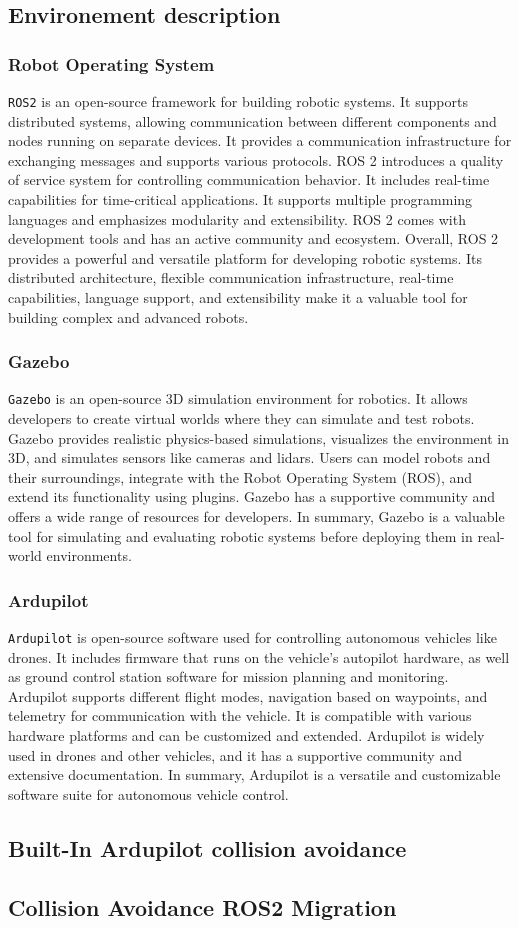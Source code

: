 \subsection{Environement description}
\subsubsection{Robot Operating System}
\texttt{ROS2} is an open-source framework for building robotic systems. It supports distributed systems, allowing communication between different components and nodes running on separate devices.
It provides a communication infrastructure for exchanging messages and supports various protocols. ROS 2 introduces a quality of service system for controlling communication behavior.
It includes real-time capabilities for time-critical applications. It supports multiple programming languages and emphasizes modularity and extensibility. ROS 2 comes with development tools and has an active community and ecosystem.
Overall, ROS 2 provides a powerful and versatile platform for developing robotic systems. Its distributed architecture, flexible communication infrastructure, real-time capabilities, language support, and extensibility make it a valuable tool for building complex and advanced robots.
\subsubsection{Gazebo}
\texttt{Gazebo} is an open-source 3D simulation environment for robotics. It allows developers to create virtual worlds where they can simulate and test robots. Gazebo provides realistic physics-based simulations, visualizes the environment in 3D, and simulates sensors like cameras and lidars.
Users can model robots and their surroundings, integrate with the Robot Operating System (ROS), and extend its functionality using plugins. Gazebo has a supportive community and offers a wide range of resources for developers.
In summary, Gazebo is a valuable tool for simulating and evaluating robotic systems before deploying them in real-world environments.
\subsubsection{Ardupilot}
\texttt{Ardupilot} is open-source software used for controlling autonomous vehicles like drones. It includes firmware that runs on the vehicle's autopilot hardware, as well as ground control station software for mission planning and monitoring.
Ardupilot supports different flight modes, navigation based on waypoints, and telemetry for communication with the vehicle. It is compatible with various hardware platforms and can be customized and extended.
Ardupilot is widely used in drones and other vehicles, and it has a supportive community and extensive documentation. In summary, Ardupilot is a versatile and customizable software suite for autonomous vehicle control.

\subsection{Built-In Ardupilot collision avoidance}

\subsection{Collision Avoidance ROS2 Migration}
